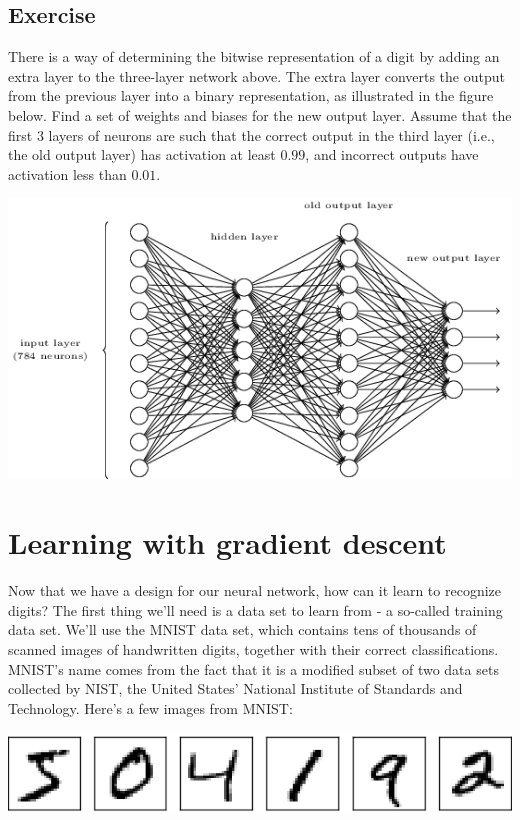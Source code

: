 \documentclass[a4paper,12pt]{report}%
\begin{document}
\subsection{Exercise}
There is a way of determining the bitwise representation of a digit by adding an extra layer to the three-layer network above. The extra layer converts the output from the previous layer into a binary representation, as illustrated in the figure below. Find a set of weights and biases for the new output layer. Assume that the first $3$ layers of neurons are such that the correct output in the third layer (i.e., the old output layer) has activation at least $0.99$, and incorrect outputs have activation less than $0.01$.
\begin{center}
 \includegraphics[width=0.85\linewidth]{images/tikz13.png}
\end{center}

\section{Learning with gradient descent}
Now that we have a design for our neural network, how can it learn to recognize digits? The first thing we'll need is a data set to learn from - a so-called training data set. We'll use the MNIST data set, which contains tens of thousands of scanned images of handwritten digits, together with their correct classifications. MNIST's name comes from the fact that it is a modified subset of two data sets collected by NIST, the United States' National Institute of Standards and Technology. Here's a few images from MNIST:
\begin{center}
 \includegraphics[width=0.75\linewidth]{images/digits_separate.png}
\end{center}
\end{document}

